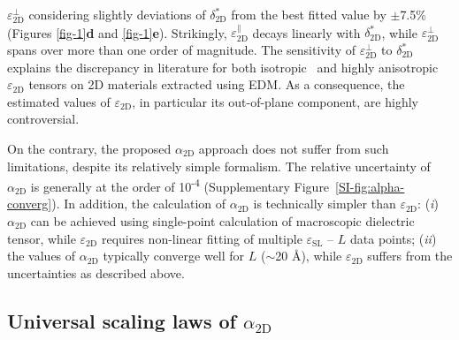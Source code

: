 \documentclass[journal=ancac3,manuscript=article,email=true,hyperref=true,keywords=false]{achemso}
\begin{document}
$\varepsilon_{\mathrm{2D}}^{\perp}$ considering slightly deviations of 
$\delta^{*}_{\mathrm{2D}}$ from the best fitted value by $\pm{}$7.5\%{} 
(Figures \ref{fig-1}\textbf{d} and \ref{fig-1}\textbf{e}). 
%
%
Strikingly, $\varepsilon_{\mathrm{2D}}^{\parallel}$ decays linearly
with $\delta^{*}_{\mathrm{2D}}$, while $\varepsilon_{\mathrm{2D}}^{\perp}$ spans
over more than one order of magnitude. 
%
The sensitivity of
$\varepsilon_{\mathrm{2D}}^{\perp}$ to $\delta^{*}_{\mathrm{2D}}$
explains the discrepancy in literature for both
isotropic~\cite{Sohier_2016} and highly
anisotropic~\cite{Matthes_2016,Laturia_2018}
$\varepsilon_{\mathrm{2D}}$ tensors on 2D materials extracted 
using EDM. 
%
As a consequence, the estimated values of
$\varepsilon_{\mathrm{2D}}$, in particular its out-of-plane component,
are highly controversial.

On the contrary, the proposed $\alpha_{\mathrm{2D}}$ approach does not
suffer from such limitations, despite its relatively simple
formalism. The relative uncertainty of $\alpha_{\mathrm{2D}}$ is
generally at the order of 10\textsuperscript{-4} (Supplementary
Figure~\ref{SI-fig:alpha-converg}). In addition, the calculation of
$\alpha_{\mathrm{2D}}$ is technically simpler than 
$\varepsilon_{\mathrm{2D}}$: ({\it i}) $\alpha_{\mathrm{2D}}$ can be
achieved using single-point calculation of macroscopic dielectric
tensor, while $\varepsilon_{\mathrm{2D}}$ requires non-linear fitting
of multiple $\varepsilon_{\mathrm{SL}}$ -- $L$ data points; ({\it ii}) the
values of $\alpha_{\mathrm{2D}}$ typically converge well for $L$
($\sim$20 \AA{}), while $\varepsilon_{\mathrm{2D}}$ suffers from the
uncertainties as described above.



\subsection{Universal scaling laws of $\alpha_{\mathrm{2D}}$}
\label{sec:univ-scal-laws}
\end{document}
